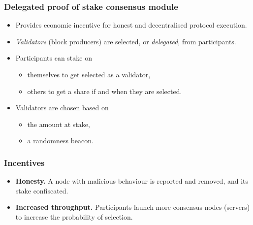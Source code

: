 \documentclass[12pt,british]{beamer}
\begin{document}
\begin{frame}
  \frametitle{Delegated proof of stake consensus module}

  \begin{itemize}
  \item Provides economic incentive for honest and decentralised protocol
    execution.
  \item \emph{Validators} (block producers) are selected, or \emph{delegated},
    from participants.
  \item Participants can stake on
    \begin{itemize}
    \item themselves to get selected as a validator,
    \item others to get a share if and when they are selected.
    \end{itemize}
  \item Validators are chosen based on
    \begin{itemize}
    \item the amount at stake,
    \item a randomness beacon.
    \end{itemize}
  \end{itemize}
\end{frame}

\begin{frame}
  \frametitle{Incentives}

  \begin{itemize}
  \item \textbf{Honesty.} A node with malicious behaviour is reported and
    removed, and its stake confiscated.

  \item \textbf{Increased throughput.} Participants launch more consensus nodes
    (servers) to increase the probability of selection.

  \end{itemize}
\end{frame}
\end{document}
